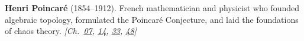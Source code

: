 \textbf{Henri Poincaré} (1854–1912). French mathematician and physicist who founded algebraic topology, formulated the Poincar\'{e} Conjecture, and laid the foundations of chaos theory. \emph{[Ch.~\hyperref[ch:billiardsconicsporism]{07}, \hyperref[ch:compacttwinparadox]{14}, \hyperref[ch:incubationinequality]{33}, \hyperref[ch:threebody]{48}]}

